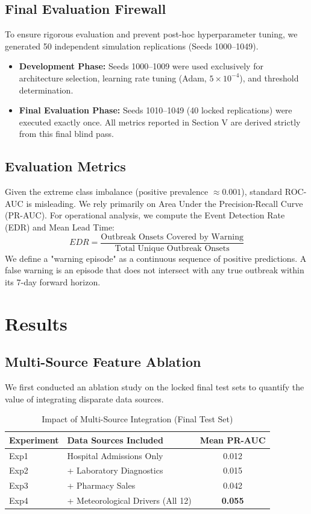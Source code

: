 \documentclass[conference]{IEEEtran}
\begin{document}
\subsection{Final Evaluation Firewall}
To ensure rigorous evaluation and prevent post-hoc hyperparameter tuning, we generated 50 independent simulation replications (Seeds 1000–1049). 
\begin{itemize}
    \item \textbf{Development Phase:} Seeds 1000–1009 were used exclusively for architecture selection, learning rate tuning (Adam, $5 \times 10^{-4}$), and threshold determination.
    \item \textbf{Final Evaluation Phase:} Seeds 1010–1049 (40 locked replications) were executed exactly once. All metrics reported in Section V are derived strictly from this final blind pass.
\end{itemize}

\subsection{Evaluation Metrics}
Given the extreme class imbalance (positive prevalence $\approx 0.001$), standard ROC-AUC is misleading. We rely primarily on Area Under the Precision-Recall Curve (PR-AUC). 
For operational analysis, we compute the Event Detection Rate (EDR) and Mean Lead Time:
\begin{equation}
    EDR = \frac{\text{Outbreak Onsets Covered by Warning}}{\text{Total Unique Outbreak Onsets}}
\end{equation}
We define a "warning episode" as a continuous sequence of positive predictions. A false warning is an episode that does not intersect with any true outbreak within its 7-day forward horizon.

\section{Results}

\subsection{Multi-Source Feature Ablation}
We first conducted an ablation study on the locked final test sets to quantify the value of integrating disparate data sources. 
\begin{table}[h]
\centering
\caption{Impact of Multi-Source Integration (Final Test Set)}
\label{tab:ablation}
\begin{tabular}{@{}llc@{}}
\toprule
\textbf{Experiment} & \textbf{Data Sources Included} & \textbf{Mean PR-AUC} \\ \midrule
Exp1 & Hospital Admissions Only & 0.012 \\
Exp2 & + Laboratory Diagnostics & 0.015 \\
Exp3 & + Pharmacy Sales & 0.042 \\
Exp4 & + Meteorological Drivers (All 12) & \textbf{0.055} \\ \bottomrule
\end{tabular}
\end{table}
\end{document}
